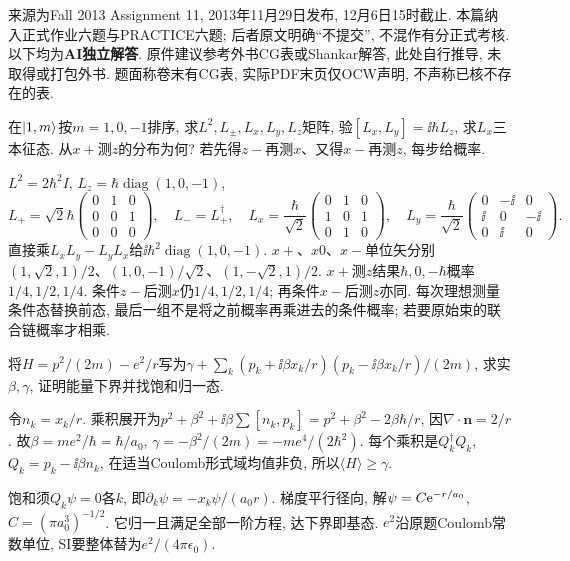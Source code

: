 来源为Fall 2013 Assignment 11, 2013年11月29日发布, 12月6日15时截止. 本篇纳入正式作业六题与PRACTICE六题; 后者原文明确“不提交”, 不混作有分正式考核. 以下均为\textbf{AI独立解答}. 原件建议参考外书CG表或Shankar解答, 此处自行推导, 未取得或打包外书. 题面称卷末有CG表, 实际PDF末页仅OCW声明, 不声称已核不存在的表.
\begin{exercise}
在$\lvert 1,m\rangle$按$m=1,0,-1$排序, 求$L^2,L_\pm,L_x,L_y,L_z$矩阵, 验$[L_x,L_y]=\ii\hbar L_z$, 求$L_x$三本征态. 从$x+$测$z$的分布为何? 若先得$z-$再测$x$、又得$x-$再测$z$, 每步给概率.
\end{exercise}
\begin{solution}
$L^2=2\hbar^2I$, $L_z=\hbar\operatorname{diag}(1,0,-1)$,
\[
L_+=\sqrt2\hbar\begin{pmatrix}0&1&0\\0&0&1\\0&0&0\end{pmatrix},\quad L_-=L_+^\dagger,\quad
L_x=\frac\hbar{\sqrt2}\begin{pmatrix}0&1&0\\1&0&1\\0&1&0\end{pmatrix},\quad
L_y=\frac\hbar{\sqrt2}\begin{pmatrix}0&-\ii&0\\\ii&0&-\ii\\0&\ii&0\end{pmatrix}.
\]
直接乘$L_xL_y-L_yL_x$给$\ii\hbar^2\operatorname{diag}(1,0,-1)$. $x+$、$x0$、$x-$单位矢分别$(1,\sqrt2,1)/2$、$(1,0,-1)/\sqrt2$、$(1,-\sqrt2,1)/2$. $x+$测$z$结果$\hbar,0,-\hbar$概率$1/4,1/2,1/4$. 条件$z-$后测$x$仍$1/4,1/2,1/4$; 再条件$x-$后测$z$亦同. 每次理想测量条件态替换前态, 最后一组不是将之前概率再乘进去的条件概率; 若要原始束的联合链概率才相乘.
\end{solution}
\begin{exercise}
将$H=p^2/(2m)-e^2/r$写为$\gamma+\sum_k(p_k+\ii\beta x_k/r)(p_k-\ii\beta x_k/r)/(2m)$, 求实$\beta,\gamma$, 证明能量下界并找饱和归一态.
\end{exercise}
\begin{solution}
令$n_k=x_k/r$. 乘积展开为$p^2+\beta^2+\ii\beta\sum[n_k,p_k]=p^2+\beta^2-2\beta\hbar/r$, 因$\nabla\cdot\boldsymbol n=2/r$. 故$\beta=me^2/\hbar=\hbar/a_0$, $\gamma=-\beta^2/(2m)=-me^4/(2\hbar^2)$. 每个乘积是$Q_k^\dagger Q_k$, $Q_k=p_k-\ii\beta n_k$, 在适当Coulomb形式域均值非负, 所以$\langle H\rangle\ge\gamma$.

饱和须$Q_k\psi=0$各$k$, 即$\partial_k\psi=-x_k\psi/(a_0r)$. 梯度平行径向, 解$\psi=C\mathrm e^{-r/a_0}$, $C=(\pi a_0^3)^{-1/2}$. 它归一且满足全部一阶方程, 达下界即基态. $e^2$沿原题Coulomb常数单位, SI要整体替为$e^2/(4\pi\epsilon_0)$.
\end{solution}
